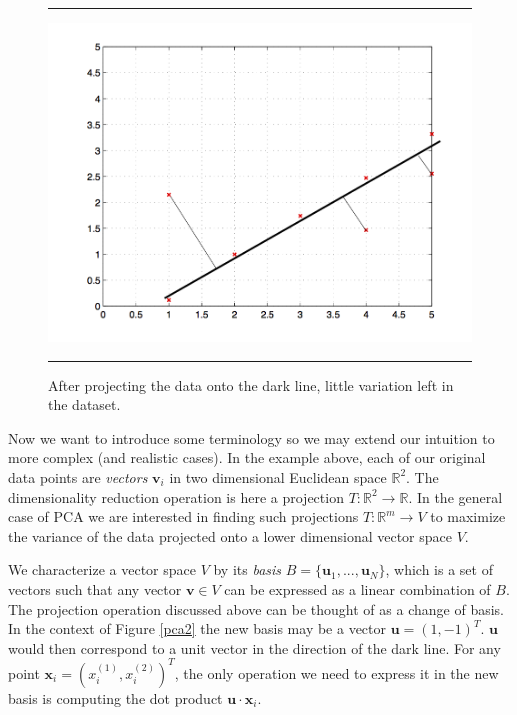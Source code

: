 \documentclass[11pt, oneside, a4paper]{report}
\begin{document}
\begin{figure}
  \centering
  \hrule
  \includegraphics[width = .9\textwidth]{Figures/pca1.png}
  \hrule
  \caption{After projecting the data onto the dark line, little
    variation left in the dataset.}
  \label{pca1}
\end{figure}

Now we want to introduce some terminology so we may extend our
intuition to more complex (and realistic cases). In the example above,
each of our original data points are \emph{vectors} $\mathbf{v}_i$ in two
dimensional Euclidean space $\mathbb{R}^2$. The dimensionality
reduction operation is here a projection $T:
\mathbb{R}^2\rightarrow\mathbb{R}$. In the general case of PCA we are
interested in finding such projections $T:
\mathbb{R}^m\rightarrow V$ to maximize the variance of the data
projected onto a lower dimensional vector space $V$.


We characterize a vector space $V$ by its \emph{basis} $B=\{\mathbf{u}_1,...,\mathbf{u}_N\}$, which is a set
of vectors such that any vector $\mathbf{v}\in V$ can be expressed as a linear
combination of $B$. The projection operation discussed above can be
thought of as a change of basis. In the context of Figure \ref{pca2}
the new basis may be a vector $\mathbf{u} = (1,-1)^T$. $\mathbf{u}$
would then correspond to a unit vector in the direction of the dark line. For any point $\mathbf{x}_i =
(x_i^{(1)}, x_i^{(2)})^T$, the only operation we need to express it in the new
basis is computing the dot product $\mathbf{u}\cdot \mathbf{x}_i$.
\end{document}
